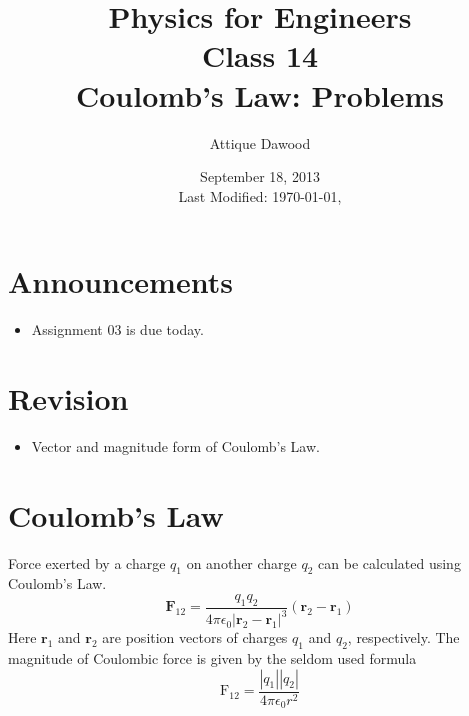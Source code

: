 \documentclass[12pt,a4paper]{article}
\title{\vspace{-2cm}Physics for Engineers\\Class 14\\Coulomb's Law: Problems}
\author{Attique Dawood}
\date{September 18, 2013\\[0.2cm] Last Modified: \today, \currenttime}
\begin{document}
\maketitle
\section{Announcements}
\begin{itemize}
\item Assignment 03 is due today.
\end{itemize}
\section{Revision}
\begin{itemize}
\item Vector and magnitude form of Coulomb's Law.
\end{itemize}
\section{Coulomb's Law}
Force exerted by a charge $q_1$ on another charge $q_2$ can be calculated using Coulomb's Law.
\begin{equation}
\textbf{F}_{12}=\dfrac{q_1q_2}{4\pi\epsilon_0 |\textbf{r}_2-\textbf{r}_1|^3}(\textbf{r}_2-\textbf{r}_1)
\end{equation}
Here $\textbf{r}_1$ and $\textbf{r}_2$ are position vectors of charges $q_1$ and $q_2$, respectively.
The magnitude of Coulombic force is given by the seldom used formula
\begin{equation}
\mathrm{F}_{12}=\dfrac{|q_1||q_2|}{4\pi\epsilon_0r^2}
\end{equation}
\newpage
\end{document}
